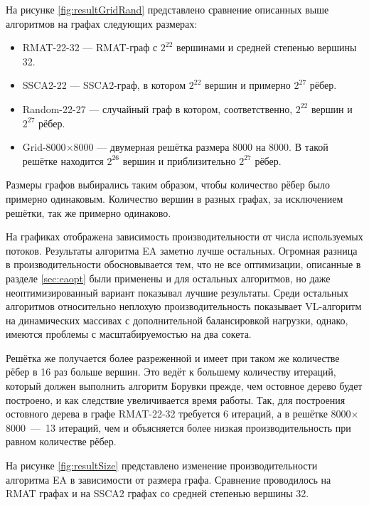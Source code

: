 \documentclass[a4paper,10pt]{extarticle}
\begin{document}



На рисунке \ref{fig:resultGridRand} представлено сравнение описанных выше алгоритмов на графах следующих размерах:
\begin{itemize}
    \item RMAT-22-32 --- RMAT-граф с $2^{22}$ вершинами и средней степенью вершины 32.
    \item SSCA2-22 --- SSCA2-граф, в котором $2^{22}$ вершин и примерно $2^{27}$ рёбер.
    \item Random-22-27 --- случайный граф в котором, соответственно, $2^{22}$ вершин и $2^{27}$ рёбер.
    \item Grid-8000$\times$8000 --- двумерная решётка размера 8000 на 8000. В такой решётке находится $2^{26}$ вершин и приблизительно $2^{27}$ рёбер.
\end{itemize}

Размеры графов выбирались таким образом, чтобы количество рёбер было примерно одинаковым. Количество вершин в разных графах, за исключением решётки, так же примерно одинаково. 

На графиках отображена зависимость производительности от числа используемых потоков.
Результаты алгоритма EA заметно лучше остальных. Огромная разница в производительности обосновывается тем, что не все оптимизации, описанные в разделе \ref{sec:eaopt} были применены и для остальных алгоритмов, но даже неоптимизированный вариант показывал лучшие результаты.
Среди остальных алгоритмов относительно неплохую производительность показывает VL-алгоритм на динамических массивах с дополнительной балансировкой нагрузки, однако, имеются проблемы с масштабируемостью на два сокета.

Решётка же получается более разреженной и имеет при таком же количестве рёбер в 16 раз больше вершин. 
Это ведёт к большему количеству итераций, который должен выполнить алгоритм Борувки прежде, чем остовное дерево будет построено, и как следствие увеличивается время работы. Так, для построения остовного дерева в графе RMAT-22-32 требуется 6 итераций, а в решётке 8000$\times$8000~---~13 итераций, чем и объясняется более низкая производительность при равном количестве рёбер.




На рисунке \ref{fig:resultSize} представлено изменение производительности алгоритма EA в зависимости от размера графа. Сравнение проводилось на RMAT графах  и на SSCA2 графах со средней степенью вершины 32. 
\end{document}
